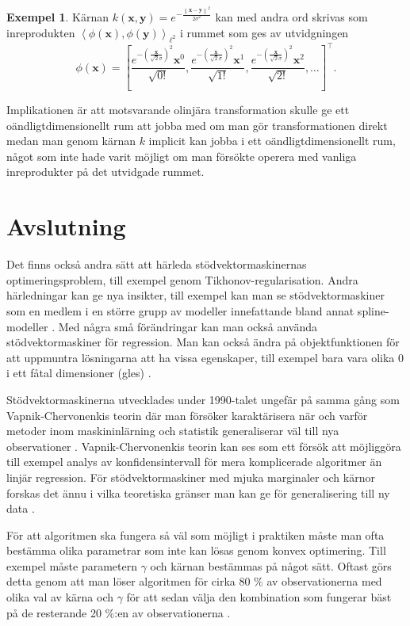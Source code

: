 \documentclass[a4paper, 12pt]{report}
\theoremstyle{definition}
\newtheorem{ex}{Exempel}[section]
\theoremstyle{remark}
\newcommand{\bfx}{\mathbf{x}}
\newcommand{\bfy}{\mathbf{y}}
\newcommand{\llangle}{\left\langle}
\newcommand{\rrangle}{\right\rangle}
\newcommand{\inner}[2]{\llangle #1, #2 \rrangle}
\begin{document}
\begin{ex}
	Kärnan $k\left(\bfx, \bfy\right)=e^{-\frac{\left\| \bfx-\bfy\right\|^2}{2\sigma^2}}$ kan med andra ord skrivas som inreprodukten $\inner{\phi\left(\bfx\right)}{\phi\left(\bfy\right)}_{\ell^2}$ i rummet som ges av utvidgningen
	\begin{equation*}
	\phi\left(\bfx\right)=\left[\frac{e^{-\left(\frac{\bfx}{\sqrt{2}\sigma}\right)^2} \bfx^0}{\sqrt{0!}}, \frac{e^{-\left(\frac{\bfx}{\sqrt{2}\sigma}\right)^2} \bfx^1}{\sqrt{1!}}, \frac{e^{-\left(\frac{\bfx}{\sqrt{2}\sigma}\right)^2} \bfx^2}{\sqrt{2!}}, \dots\right]^\intercal.
	\end{equation*}
	
	Implikationen är att motsvarande olinjära transformation skulle ge ett oändligtdimensionellt rum att jobba med om man gör transformationen direkt medan man genom kärnan $k$ implicit kan jobba i ett oändligtdimensionellt rum, något som inte hade varit möjligt om man försökte operera med vanliga inreprodukter på det utvidgade rummet.
\end{ex}



\chapter{Avslutning}
Det finns också andra sätt att härleda stödvektormaskinernas optimeringsproblem, till exempel genom Tikhonov-regularisation. Andra härledningar kan ge nya insikter, till exempel kan man se stödvektormaskiner som en medlem i en större grupp av modeller innefattande bland annat spline-modeller \cite{ESL}. Med några små förändringar kan man också använda stödvektormaskiner för regression. Man kan också ändra på objektfunktionen för att uppmuntra lösningarna att ha vissa egenskaper, till exempel bara vara olika 0 i ett fåtal dimensioner (gles) \cite{LearningKernels}.

Stödvektormaskinerna utvecklades under 1990-talet ungefär på samma gång som Vapnik-Chervonenkis teorin där man försöker karaktärisera när och varför metoder inom maskininlärning och statistik generaliserar väl till nya observationer \cite{VC}. Vapnik-Chervonenkis teorin kan ses som ett försök att möjliggöra till exempel analys av konfidensintervall för mera komplicerade algoritmer än linjär regression. För stödvektormaskiner med mjuka marginaler och kärnor forskas det ännu i vilka teoretiska gränser man kan ge för generalisering till ny data \cite{theoretical}.

För att algoritmen ska fungera så väl som möjligt i praktiken måste man ofta bestämma olika parametrar som inte kan lösas genom konvex optimering. Till exempel måste parametern $\gamma$ och kärnan bestämmas på något sätt. Oftast görs detta genom att man löser algoritmen för cirka 80 \% av observationerna med olika val av kärna och $\gamma$ för att sedan välja den kombination som fungerar bäst på de resterande 20 \%:en av observationerna \cite{ESL}.
\end{document}
